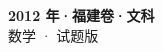 \documentclass[zihao=-4, a4paper]{ctexart}
\begin{document}
\begin{center}
  {\Large\bfseries 2012 年·福建卷·文科}\\[4pt]
  {\large 数学 · 试题版}
\end{center}
\medskip
{}

\end{document}

